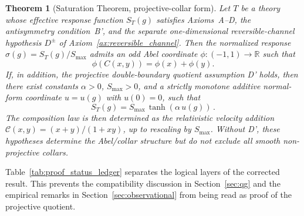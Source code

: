 \documentclass[aps,prd,twocolumn,superscriptaddress,nofootinbib]{revtex4-2}
\newtheorem{theorem}{Theorem}
\begin{document}
\begin{theorem}[Saturation Theorem, projective-collar form]
\label{thm:saturation}
Let $T$ be a theory whose effective response function $S_T(g)$ satisfies Axioms~A--D, the antisymmetry condition~B', and the separate one-dimensional reversible-channel hypothesis $D^\pm$ of Axiom~\ref{ax:reversible_channel}. Then the normalized response $\sigma(g)=S_T(g)/S_{\max}$ admits an odd Abel coordinate $\phi:(-1,1)\to\mathbb{R}$ such that
\[
  \phi(C(x,y))=\phi(x)+\phi(y).
\]
If, in addition, the projective double-boundary quotient assumption D' holds, then there exist constants $\alpha > 0$, $S_{\max} > 0$, and a strictly monotone additive normal-form coordinate $u = u(g)$ with $u(0) = 0$, such that
\begin{equation}
S_T(g) = S_{\max}\,\tanh\!\left(\alpha\,u(g)\right)\,.
\label{eq:saturation_form}
\end{equation}
The composition law is then determined as the relativistic velocity addition $\mathcal{C}(x,y) = (x+y)/(1+xy)$, up to rescaling by $S_{\max}$. Without D', these hypotheses determine the Abel/collar structure but do not exclude all smooth non-projective collars.
\end{theorem}

Table~\ref{tab:proof_status_ledger} separates the logical layers of the corrected result. This prevents the compatibility discussion in Section~\ref{sec:qg} and the empirical remarks in Section~\ref{sec:observational} from being read as proof of the projective quotient.
\end{document}
